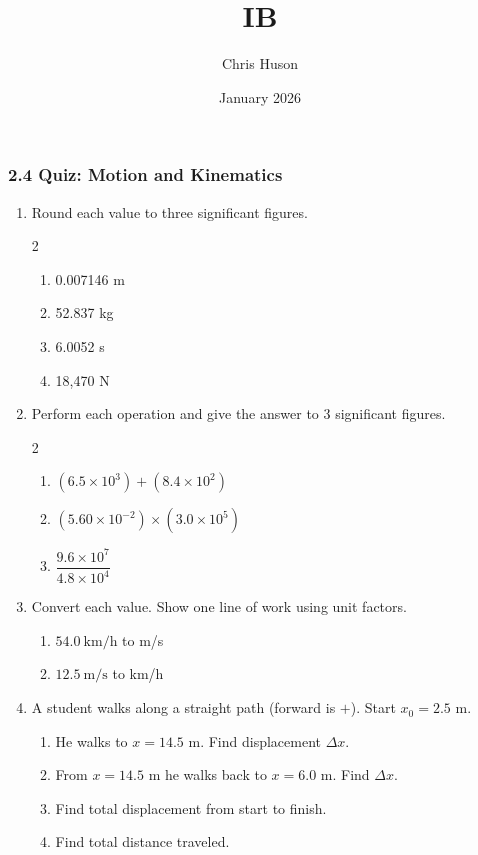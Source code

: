 \documentclass[12pt, twoside]{article}
\title{IB}
\author{Chris Huson}
\date{January 2026}
\begin{document}
\subsubsection*{2.4 Quiz: Motion and Kinematics}

\begin{enumerate}[itemsep=1cm]

\item Round each value to three significant figures.
  \begin{multicols}{2}
  \begin{enumerate}[itemsep=1cm]
    \item 0.007146 m
    \item 52.837 kg
    \item 6.0052 s
    \item 18,470 N
  \end{enumerate}
  \end{multicols}
  \vspace{1cm}

\item Perform each operation and give the answer to 3 significant figures.
  \begin{multicols}{2}
  \begin{enumerate}[itemsep=1.5cm]
    \item $(6.5\times10^{3}) + (8.4\times10^{2})$
    \item $(5.60\times10^{-2}) \times (3.0\times10^{5})$
    \item $\dfrac{9.6\times10^{7}}{4.8\times10^{4}}$
  \end{enumerate}
  \end{multicols}
  \vspace{1.5cm}

\item Convert each value. Show one line of work using unit factors.
  \begin{enumerate}[itemsep=2.5cm]
    \item $54.0~\text{km/h}$ to m/s
    \item $12.5~\text{m/s}$ to km/h
  \end{enumerate}
  \vspace{1.5cm}

\newpage
\item A student walks along a straight path (forward is $+$). Start $x_0 = 2.5$ m.
  \begin{enumerate}[itemsep=1.5cm]
    \item He walks to $x = 14.5$ m. Find displacement $\Delta x$.
    \item From $x=14.5$ m he walks back to $x=6.0$ m. Find $\Delta x$.
    \item Find total displacement from start to finish.
    \item Find total distance traveled.
  \end{enumerate}
  \vspace{2cm}


\end{enumerate}
\end{document}
